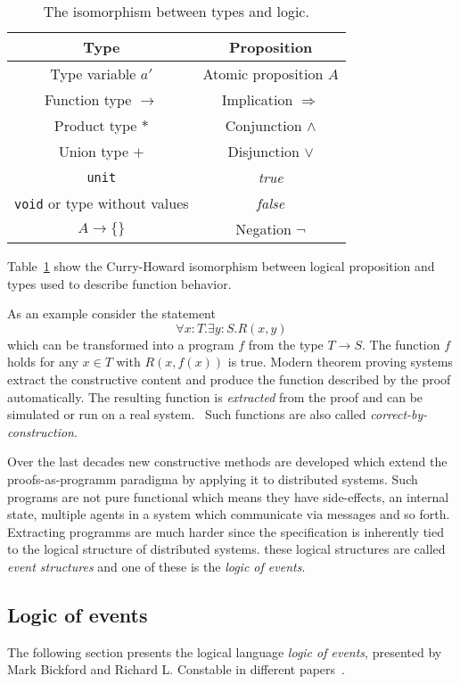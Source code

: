 \begin{table}[h]
  \centering
  \begin{tabular}{c|c}
    Type & Proposition\\\hline
    Type variable $a'$ & Atomic proposition $A$\\
    Function type $\rightarrow$ & Implication $\Rightarrow$\\
    Product type $*$ & Conjunction $\wedge$\\
    Union type $+$ & Disjunction $\vee$\\
    \texttt{unit} & \textit{true} \\
    \texttt{void} or type without values & \textit{false}\\
    $A\rightarrow \{\}$ & Negation $\neg$ \\
  \end{tabular}
  \caption{The isomorphism between types and logic.}
  \label{tab:proofsasprogs}
\end{table}

Table~\ref{tab:proofsasprogs} show the Curry-Howard isomorphism between
logical proposition and types used to describe function behavior.

As an example consider the statement
\[
  \forall x:T.\exists y:S.R(x,y)
\]
which can be transformed into a program $f$ from the type $T\rightarrow S$.
The function $f$ holds for any $x\in T$ with $R(x,f(x))$ is true.
Modern theorem proving systems extract the constructive content and
produce the function described by the proof automatically.
The resulting function is \textit{extracted} from the proof
and can be simulated or run on a real system.~\cite{bickford2009component}
Such functions are also called \textit{correct-by-construction}.

Over the last decades new constructive methods are developed which
extend the proofs-as-programm paradigma by applying it to distributed
systems. Such programs are not pure functional which means they have
side-effects, an internal state, multiple agents in a system which
communicate via messages and so forth. Extracting programms
are much harder since the specification is inherently tied to
the logical structure of distributed systems. these logical
structures are called \textit{event structures} and one of these
is the \textit{logic of events}.~\cite{bickford2009component}


\subsection{Logic of events}
The following section presents the logical language \textit{logic of events},
presented by Mark Bickford and Richard L. Constable in different
papers~\cite{bickford2003logic, bickford2005causal, bickford2009component}.




